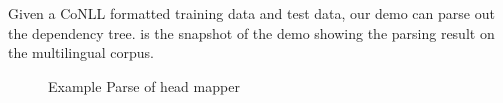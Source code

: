 Given a CoNLL formatted training data and test data, our demo can parse out the dependency tree.
 is the snapshot of the demo showing
the parsing result on the multilingual corpus.

\begin{figure*}[th]
\centering
{}
\caption{Example Parse of head mapper}
\label{fig:nonprojdemo}
\end{figure*}
